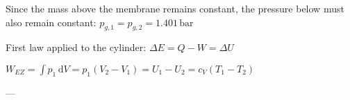 Since the mass above the membrane remains constant, the pressure below must also remain constant:  
\( p_{g,1} = p_{g,2} = 1.401 \, \text{bar} \)  

First law applied to the cylinder:  
\( \Delta E = Q - W = \Delta U \)  

\( W_{EZ} = \int p_1 \, \text{d}V = p_1 (V_2 - V_1) = U_1 - U_2 = c_V (T_1 - T_2) \)  

---